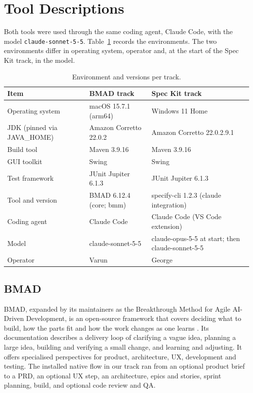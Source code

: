 \documentclass[conference]{IEEEtran}
\begin{document}
\section{Tool Descriptions}\label{tool-descriptions}

Both tools were used through the same coding agent, Claude Code, with
the model \texttt{claude-sonnet-5-5}. Table~\ref{tbl-env} records
the environments. The two environments differ in operating system,
operator and, at the start of the Spec Kit track, in the model.

\begin{table}[htbp]
\caption{Environment and versions per track.}\label{tbl-env}
\centering\footnotesize\setlength{\tabcolsep}{3pt}
\begin{tabular}{>{\raggedright\arraybackslash}p{} >{\raggedright\arraybackslash}p{} >{\raggedright\arraybackslash}p{}}
\hline
\textbf{Item} & \textbf{BMAD track} & \textbf{Spec Kit track} \\
\hline
Operating system & macOS 15.7.1 (arm64) & Windows 11 Home \\
JDK (pinned via JAVA\_HOME) & Amazon Corretto 22.0.2 & Amazon Corretto 22.0.2.9.1 \\
Build tool & Maven 3.9.16 & Maven 3.9.16 \\
GUI toolkit & Swing & Swing \\
Test framework & JUnit Jupiter 6.1.3 & JUnit Jupiter 6.1.3 \\
Tool and version & BMAD 6.12.4 (core; bmm) & specify-cli 1.2.3 (claude integration) \\
Coding agent & Claude Code & Claude Code (VS Code extension) \\
Model & claude-sonnet-5-5 & claude-opus-5-5 at start; then claude-sonnet-5-5 \\
Operator & Varun & George \\
\hline
\end{tabular}
\end{table}

\subsection{BMAD}\label{bmad}

BMAD, expanded by its maintainers as the Breakthrough Method for Agile
AI-Driven Development, is an open-source framework that covers deciding
what to build, how the parts fit and how the work changes as one learns
\cite{bmad}. Its documentation describes a delivery loop of clarifying
a vague idea, planning a large idea, building and verifying a small
change, and learning and adjusting. It offers specialised perspectives
for product, architecture, UX, development and testing. The installed
native flow in our track ran from an optional product brief to a PRD, an
optional UX step, an architecture, epics and stories, sprint planning,
build, and optional code review and QA.
\end{document}
